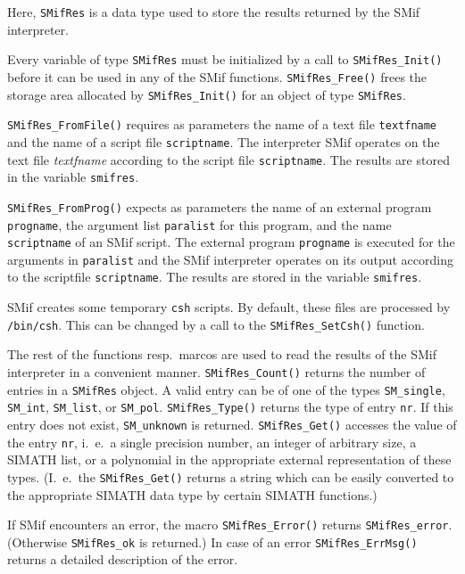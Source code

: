 \documentclass{article}
\begin{document}
Here, \texttt{SMifRes} is a data type used to store the results
returned by the SMif interpreter.

Every variable of type \texttt{SMifRes} must be initialized by a call
to \texttt{SMifRes\_Init()} before it can be used in any of the SMif
functions.  \texttt{SMifRes\_Free()} frees the storage area allocated
by \texttt{SMifRes\_Init()} for an object of type \texttt{SMifRes}.

\texttt{SMifRes\_FromFile()} requires as parameters the name of a text
file \texttt{textfname} and the name of a script file
\texttt{scriptname}.  The interpreter SMif operates on the text file
\emph{textfname} according to the script file \texttt{scriptname}. The
results are stored in the variable \texttt{smifres}.

\texttt{SMifRes\_FromProg()} expects as parameters the name of an
external program \texttt{progname}, the argument list
\texttt{paralist} for this program, and the name \texttt{scriptname}
of an SMif script. The external program \texttt{progname} is executed
for the arguments in \texttt{paralist} and the SMif interpreter
operates on its output according to the scriptfile
\texttt{scriptname}. The results are stored in the variable
\texttt{smifres}.

SMif creates some temporary \texttt{csh} scripts. By default, these
files are processed by \texttt{/bin/csh}. This can be changed by a
call to the \texttt{SMifRes\_SetCsh()} function.

The rest of the functions resp.\ marcos are used to read the results
of the SMif interpreter in a convenient manner.
\texttt{SMifRes\_Count()} returns the number of entries in a
\texttt{SMifRes} object. A valid entry can be of one of the types
\texttt{SM\_single}, \texttt{SM\_int}, \texttt{SM\_list}, or
\texttt{SM\_pol}.  \texttt{SMifRes\_Type()} returns the type of entry
\texttt{nr}. If this entry does not exist, \texttt{SM\_unknown} is
returned.  \texttt{SMifRes\_Get()} accesses the value of the entry
\texttt{nr}, i.\ e.\ a single precision number, an integer of
arbitrary size, a SIMATH list, or a polynomial in the appropriate
external representation of these types.  (I.\ e.\ the
\texttt{SMifRes\_Get()} returns a string which can be easily converted
to the appropriate SIMATH data type by certain SIMATH functions.)

If SMif encounters an error, the macro \texttt{SMifRes\_Error()}
returns \texttt{SMifRes\_error}. (Otherwise \texttt{SMifRes\_ok} is
returned.)  In case of an error \texttt{SMifRes\_ErrMsg()} returns a
detailed description of the error.
\end{document}
